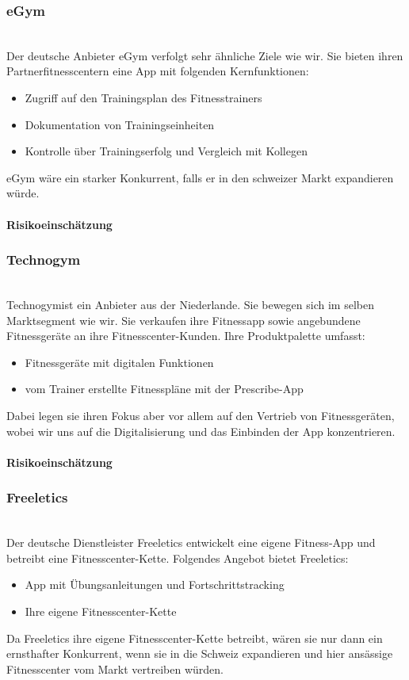 \subsubsection{eGym}\hfill \\
Der deutsche Anbieter eGym\cite{egym} verfolgt sehr ähnliche Ziele wie wir. Sie bieten ihren Partnerfitnesscentern eine App mit folgenden Kernfunktionen:
\begin{itemize}
	\item Zugriff auf den Trainingsplan des Fitnesstrainers
	\item Dokumentation von Trainingseinheiten
	\item Kontrolle über Trainingserfolg und Vergleich mit Kollegen
\end{itemize}
eGym wäre ein starker Konkurrent, falls er in den schweizer Markt expandieren würde.
\paragraph{Risikoeinschätzung} \qquad {}
\subsubsection{Technogym}\hfill \\
Technogym\cite{technogym}ist ein Anbieter aus der Niederlande. Sie bewegen sich im selben Marktsegment wie wir. Sie verkaufen ihre Fitnessapp sowie angebundene Fitnessgeräte an ihre Fitnesscenter-Kunden.
Ihre Produktpalette umfasst:
\begin{itemize}
	\item Fitnessgeräte mit digitalen Funktionen
	\item vom Trainer erstellte Fitnesspläne mit der Prescribe-App
\end{itemize}
Dabei legen sie ihren Fokus aber vor allem auf den Vertrieb von Fitnessgeräten, wobei wir uns auf die Digitalisierung und das Einbinden der App konzentrieren.
\paragraph{Risikoeinschätzung} \qquad {}
\subsubsection{Freeletics}\hfill \\
Der deutsche Dienstleister Freeletics\cite{freeletics} entwickelt eine eigene Fitness-App und betreibt eine Fitnesscenter-Kette.
Folgendes Angebot bietet Freeletics:
\begin{itemize}
	\item App mit Übungsanleitungen und Fortschrittstracking
	\item Ihre eigene Fitnesscenter-Kette
\end{itemize}
Da Freeletics ihre eigene Fitnesscenter-Kette betreibt, wären sie nur dann ein ernsthafter Konkurrent, wenn sie in die Schweiz expandieren und hier ansässige Fitnesscenter vom Markt vertreiben würden.
